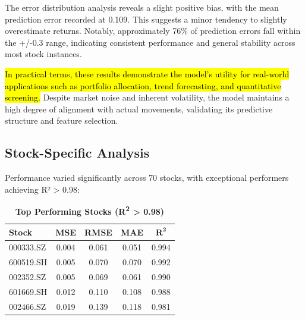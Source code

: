 \documentclass[3p,times,procedia]{elsarticle}
\begin{document}
The error distribution analysis reveals a slight positive bias, with the mean prediction error recorded at 0.109. This suggests a minor tendency to slightly overestimate returns. Notably, approximately 76\% of prediction errors fall within the +/-0.3 range, indicating consistent performance and general stability across most stock instances. 

\hl{In practical terms, these results demonstrate the model's utility for real-world applications such as portfolio allocation, trend forecasting, and quantitative screening.} Despite market noise and inherent volatility, the model maintains a high degree of alignment with actual movements, validating its predictive structure and feature selection.


\subsection{Stock-Specific Analysis}
\vspace{-2pt}
Performance varied significantly across 70 stocks, with exceptional performers achieving R² > 0.98:

\begin{table}[!ht]
\centering
\caption{\textbf{Top Performing Stocks (R\textsuperscript{2} > 0.98)}}
\renewcommand{\arraystretch}{1.1}
\setlength{\tabcolsep}{8pt}
\begin{tabular}{|l|c|c|c|c|}
\hline
\textbf{Stock} & \textbf{MSE} & \textbf{RMSE} & \textbf{MAE} & \textbf{$\mathbf{R^2}$} \\
\hline
000333.SZ  & 0.004 & 0.061 & 0.051 & 0.994 \\
600519.SH  & 0.005 & 0.070 & 0.070 & 0.992 \\
002352.SZ  & 0.005 & 0.069 & 0.061 & 0.990 \\
601669.SH  & 0.012 & 0.110 & 0.108 & 0.988 \\
002466.SZ  & 0.019 & 0.139 & 0.118 & 0.981 \\
\hline
\end{tabular}
\end{table}
\end{document}
